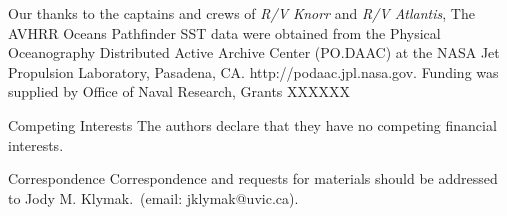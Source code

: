 \documentclass{natureJMK}
\begin{document}





\begin{addendum}
 \item  Our thanks to the captains and crews of \emph{R/V Knorr} and \emph{R/V Atlantis}, The AVHRR Oceans Pathfinder SST data were obtained from the Physical Oceanography Distributed Active Archive Center (PO.DAAC) at the NASA Jet Propulsion Laboratory, Pasadena, CA. http://podaac.jpl.nasa.gov. Funding was supplied by Office of Naval Research, Grants XXXXXX
 \item[Competing Interests] The authors declare that they have no
competing financial interests.
 \item[Correspondence] Correspondence and requests for materials
should be addressed to Jody M. Klymak.~(email: jklymak@uvic.ca).
\end{addendum}

\end{document}
